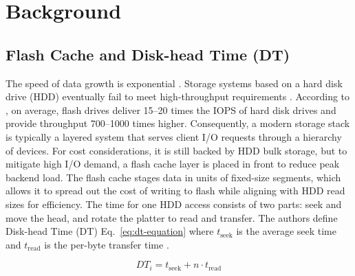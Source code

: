 \section{Background}
\subsection{Flash Cache and Disk-head Time (DT)}

The speed of data growth is exponential \cite{turner2014digital}. Storage systems based on a hard disk drive (HDD) eventually fail to meet high-throughput requirements \cite{ren2019hybrid}.
According to \cite{luettgau2018survey}, on average, flash drives deliver 15--20 times the IOPS of hard disk drives and provide throughput 700--1000 times higher. Consequently, a modern storage stack is typically a layered system that serves client I/O requests through a hierarchy of devices. For cost considerations, it is still backed by HDD bulk storage, but to mitigate high I/O demand, a flash cache layer is placed in front to reduce peak backend load. The flash cache stages data in units of fixed-size segments, which allows it to spread out the cost of writing to flash while aligning with HDD read sizes for efficiency.  
The time for one HDD access consists of two parts: seek and move the head, and rotate the platter to read and transfer. The authors define Disk-head Time (DT) Eq.~\eqref{eq:dt-equation} where 
$t_{\text{seek}}$ is the average seek time and $t_{\text{read}}$ is the 
per-byte transfer time \cite{wong2024baleen}. 
\vspace{-0.5em} %
\begin{small}
\begin{equation}
DT_i = t_{\text{seek}} + n \cdot t_{\text{read}}
\label{eq:dt-equation}
\end{equation}
\end{small}


